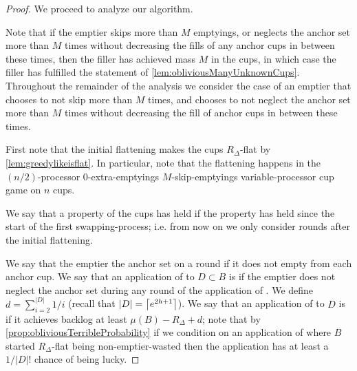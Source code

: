 \begin{proof}
We proceed to analyze our algorithm.

Note that if the emptier skips more than $M$ emptyings, or
neglects the anchor set more than $M$ times without decreasing
the fills of any anchor cups in between these times, then the filler has
achieved mass $M$ in the cups, in which case the filler has
fulfilled the statement of \cref{lem:obliviousManyUnknownCups}. 
Throughout the remainder of the analysis we consider the case of an
emptier that chooses to not skip more than $M$ times, and chooses
to not neglect the anchor set more than $M$ times without
decreasing the fill of anchor cups in between these times.

First note that the initial flattening makes the cups
$R_\Delta$-flat by \cref{lem:greedylikeisflat}. In particular,
note that the flattening happens in the $(n/2)$-processor
$0$-extra-emptyings $M$-skip-emptyings variable-processor cup
game on $n$ cups.

We say that a property of the cups has  held if the
property has held since the start of the first swapping-process;
i.e. from now on we only consider rounds after the initial
flattening.

We say that the emptier  the anchor set on a round
if it does not empty from each anchor cup. We say that an
application of \randalg to $D\subset B$ is
 if the emptier does not neglect the
anchor set during any round of the application of \randalg. We
define $d = \sum_{i=2}^{|D|} 1/i$ (recall that $|D| =
\left\lceil e^{2h+1} \right\rceil$). We say that an application of \randalg to $D$
is  if it achieves backlog at least $\mu(B) -
R_\Delta + d$; note that by
\cref{prop:obliviousTerribleProbability} if we condition on an
application of \randalg where $B$ started $R_\Delta$-flat being
non-emptier-wasted then the application has at least a $1/|D|!$
chance of being lucky.


\end{proof}
